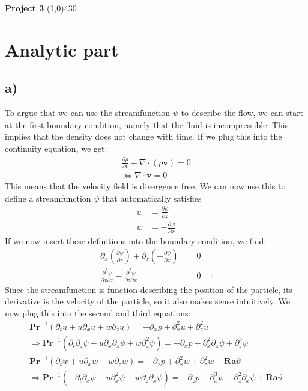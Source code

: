 \documentclass{article}
\newcommand{\AssignmentNum}{3}
\begin{document}
    \setlength{\headheight}{23.10004pt}
    \begin{center}
    \LARGE{\bfseries{ Project \AssignmentNum}}
    \line(1,0){430}
    \end{center}

\section{Analytic part}

\subsection*{a)}
To argue that we can use the streamfunction $\psi$ to describe the flow, we can start at the first boundary condition, namely that the fluid is incompressible. This implies that the density does not change with time. If we plug this into the continuity equation, we get:
\begin{align*}
    \frac{\partial \rho}{\partial t} + \nabla \cdot (\rho \mathbf{v}) = 0 \\
    \Leftrightarrow \nabla \cdot \mathbf{v} = 0
\end{align*}
This means that the velocity field is divergence free. We can now use this to define a streamfunction $\psi$ that automatically satisfies
\begin{align*}
    u &= \frac{\partial \psi}{\partial z}  \\
    w &= -\frac{\partial \psi}{\partial x}
\end{align*}
If we now insert these definitions into the boundary condition, we find:
\begin{align*}
    \partial _x \left( \frac{\partial \psi}{\partial z} \right) + \partial _z \left( -\frac{\partial \psi}{\partial x} \right) &= 0 \\
    \frac{\partial^2 \psi}{\partial x \partial z} - \frac{\partial^2 \psi}{\partial z \partial x} &= 0 \quad \square
\end{align*}
Since the streamfunction is function describing the position of the particle, its derivative is the velocity of the particle, so it also makes sense intuitively. 
We now plug this into the second and third equations:
\begin{align*}
    \textbf{Pr}^{-1}(\partial _t u+ u\partial_xu+
    w\partial _zu)=-\partial _xp+\partial ^2_xu+\partial ^2_zu\\
    \Rightarrow \textbf{Pr}^{-1}(\partial _t \partial_z \psi+ u \partial_x\partial_z \psi+w \partial _z^2\psi)=-\partial _xp+\partial ^2_x\partial_z\psi+\partial ^3_z\psi\\
    \textbf{Pr}^{-1}(\partial _t w+ u\partial _xw+w\partial _zw)=-\partial _zp+\partial ^2_xw+\partial ^2_zw+\textbf{Ra}\vartheta\\
    \Rightarrow \textbf{Pr}^{-1}(-\partial _t \partial_x \psi-u \partial_x^2 \psi-w \partial_z \partial_x \psi)=-\partial _zp-\partial ^3_x\psi-\partial ^2_z\partial _x\psi+\textbf{Ra}\vartheta
\end{align*}
\end{document}
